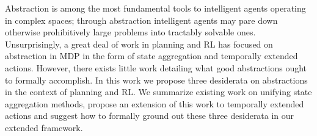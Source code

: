 Abstraction is among the most fundamental tools to intelligent agents operating in complex spaces; through abstraction intelligent agents may pare down otherwise prohibitively large problems into tractably solvable ones. Unsurprisingly, a great deal of work in planning and \ac{RL} has focused on abstraction in \ac{MDP} in the form of state aggregation and temporally extended actions. However, there exists little work detailing what good abstractions ought to formally accomplish. In this work we propose three desiderata on abstractions in the context of planning and \ac{RL}. We summarize existing work on unifying state aggregation methods, propose an extension of this work to temporally extended actions and suggest how to formally ground out these three desiderata in our extended framework. 